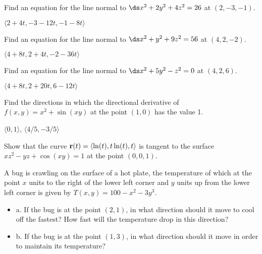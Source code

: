 \begin{exercises}
\begin{exercise} Find an equation for the line normal to 
$\ds x^2+2y^2+4z^2=26 $ at $(2,-3,-1)$.
\begin{answer} $\langle 2+4t,-3-12t,-1-8t\rangle$
\end{answer}\end{exercise}

\begin{exercise} Find an equation for the line normal to 
$\ds x^2+y^2+9z^2=56$ at $(4,2,-2)$.
\begin{answer} $\langle 4+8t,2+4t,-2-36t\rangle$
\end{answer}\end{exercise}

\begin{exercise} Find an equation for the line normal to 
$\ds x^2+5y^2-z^2=0$ at $(4,2,6)$.
\begin{answer} $\langle 4+8t,2+20t,6-12t\rangle$
\end{answer}\end{exercise}

\begin{exercise} Find the directions in which the directional derivative of
$f(x,y)=x^2+\sin(xy)$ at the point $(1,0)$ has the value 1.
\begin{answer} $\langle 0,1\rangle$, $\langle 4/5,-3/5\rangle$
\end{answer}\end{exercise}

\begin{exercise} Show that the curve 
${\bf r}(t) = \langle\ln(t),t\ln(t),t\rangle$
is tangent to the surface $xz^2-yz+\cos(xy) = 1$ at the point
$(0,0,1)$.

\begin{exercise} A bug is crawling on the surface of a hot plate, the
temperature of which at the point $x$ units to the right of the lower
left corner and $y$ units up from the lower left corner is given by
$T(x,y)=100-x^2-3y^3$.

\begin{itemize} %

\item{a.} If the bug is at the point $(2,1)$, in what direction should it
  move to cool off the fastest?  How fast will the temperature drop in
  this direction?

\item{b.} If the bug is at the point $(1,3)$, in what direction should it
  move in order to maintain its temperature?


\end{itemize}
\end{exercise}
\end{exercise}
\end{exercises}
